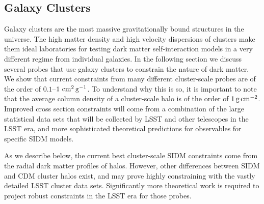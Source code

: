\subsection{Galaxy Clusters }
\label{sec:halo_profile_clusters}

Galaxy clusters are the most massive gravitationally bound structures in the universe. The high matter density and high velocity dispersions of clusters make them ideal laboratories for testing dark matter self-interaction models in a very different regime from individual galaxies.
In the following section we discuss several probes that use galaxy clusters to constrain the nature of dark matter.  We show that current constraints from many different cluster-scale probes are of the order of $0.1$--$1\mathrm{\,\mathrm{\,cm}^2\mathrm{\,g}^{-1}}$.  To understand why this is so, it is important to note that the average column density of a cluster-scale halo is of the order of $1 \mathrm{\,g} \mathrm{\,cm}^{-2}$.  Improved cross section constraints will come from a combination of the large statistical data sets that will be collected by LSST and other telescopes in the LSST era, and more sophisticated theoretical predictions for observables for specific SIDM models.

\vspace{1em} 

As we describe below, the current best cluster-scale SIDM constraints come from the radial dark matter profiles of halos.  However, other differences between SIDM and CDM cluster halos exist, and may prove highly constraining with the vastly detailed LSST cluster data sets.  Significantly more theoretical work is required to project robust constraints in the LSST era for those probes.

